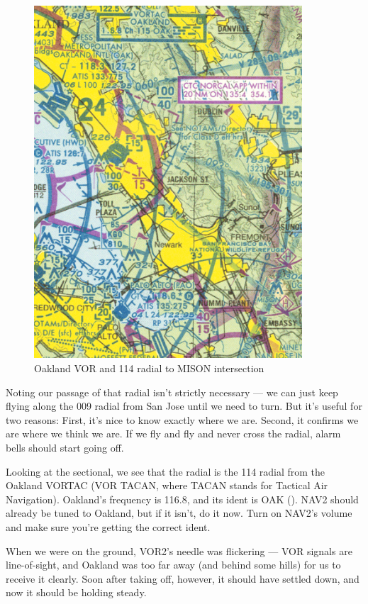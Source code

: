 \begin{figure}
  \begin{center}
    \includegraphics[width=10cm]{img/Oakland}
    \caption{Oakland VOR and 114 radial to MISON intersection}
    \label{fig:Oakland}
  \end{center}
\end{figure}

Noting our passage of that radial isn't strictly necessary --- we can
just keep flying along the 009 radial from San Jose until we need to
turn.  But it's useful for two reasons: First, it's nice to know
exactly where we are.  Second, it confirms we are where we think we
are.  If we fly and fly and never cross the radial, alarm bells should
start going off.


Looking at the sectional, we see that the radial is the 114 radial
from the Oakland VORTAC (VOR TACAN, where TACAN stands for Tactical
Air Navigation).  Oakland's frequency is 116.8, and its ident is OAK
(\mdash\mdash\mdash\mspace \mdot\mdash\mspace \mdash\mdot\mdash).
NAV2 should already be tuned to Oakland, but if it isn't, do it now.
Turn on NAV2's volume and make sure you're getting the correct ident.


When we were on the ground, VOR2's needle was flickering --- VOR
signals are line-of-sight, and Oakland was too far away (and behind
some hills) for us to receive it clearly.  Soon after taking off,
however, it should have settled down, and now it should be holding
steady.

